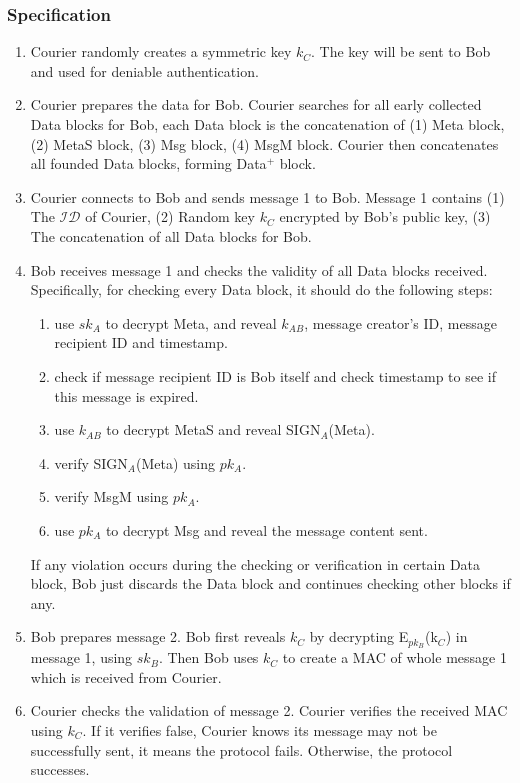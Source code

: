 \subsubsection{Specification}
\begin{enumerate}
\item Courier randomly creates a symmetric key $k_C$. The key will be sent to Bob and used for deniable authentication.

\item Courier prepares the data for Bob. Courier searches for all early collected Data blocks for Bob, each Data block is the concatenation of (1) Meta block, (2) MetaS block, (3) Msg block, (4) MsgM block. Courier then concatenates all founded Data blocks, forming Data$^+$ block.

\item Courier connects to Bob and sends message 1 to Bob. Message 1 contains (1) The $\mathcal{ID}$ of Courier, (2) Random key $ k_C $ encrypted by Bob's public key, (3) The concatenation of all Data blocks for Bob.

\item Bob receives message 1 and checks the validity of all Data blocks received. Specifically, for checking every Data block, it should do the following steps:
 \begin{enumerate}
 \item use $ sk_A $ to decrypt Meta, and reveal $ k_{AB} $, message creator's ID, message recipient ID and timestamp.
 \item check if message recipient ID is Bob itself and check timestamp to see if this message is expired.
 \item use $ k_{AB} $ to decrypt MetaS and reveal SIGN$_A$(Meta).
 \item verify SIGN$_A$(Meta) using $ pk_A $.
 \item verify MsgM using $ pk_A $.
 \item use $ pk_A $ to decrypt Msg and reveal the message content sent.
 \end{enumerate}
If any violation occurs during the checking or verification in certain Data block, Bob just discards the Data block and continues checking other blocks if any.

\item Bob prepares message 2. Bob first reveals $ k_C $ by decrypting E$_{pk_B}$(k$_C$) in message 1, using $ sk_B $. Then Bob uses $ k_C $ to create a MAC of whole message 1 which is received from Courier. 

\item Courier checks the validation of message 2. Courier verifies the received MAC using $ k_C $. If it verifies false, Courier knows its message may not be successfully sent, it means the protocol fails. Otherwise, the protocol successes.
\end{enumerate}
